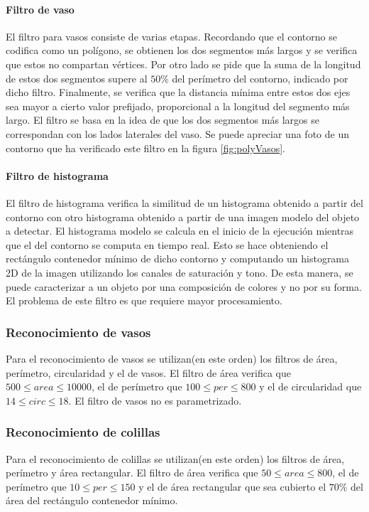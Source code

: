 	\paragraph{Filtro de vaso}
	El filtro para vasos consiste de varias etapas. Recordando que el contorno se codifica como un pol\'igono, se obtienen los dos segmentos 
	m\'as largos y se verifica que estos no compartan v\'ertices. Por otro lado se pide que la suma de la longitud de estos dos segmentos supere al $50\%$ del 
	per\'imetro del contorno, indicado por dicho filtro. Finalmente, se verifica que la distancia m\'inima entre estos dos ejes sea mayor a cierto valor prefijado, proporcional a la
	longitud del segmento m\'as largo. El filtro se basa en la idea de que 
	los dos segmentos m\'as largos se correspondan con los lados laterales 
	del vaso.  Se puede apreciar una foto  de un contorno que ha 
	verificado este filtro en la figura \ref{fig:polyVasos}. 
	\paragraph{Filtro de histograma}
	El filtro de histograma verifica la similitud de un histograma obtenido a partir del contorno con otro histograma obtenido a partir de 
	una imagen modelo del objeto a detectar. El histograma modelo se calcula en el inicio de la ejecuci\'on mientras que el del contorno se
	computa en tiempo real. Esto se hace obteniendo el rect\'angulo 
	contenedor m\'inimo de dicho contorno y computando un histograma 2D de la imagen
	utilizando los canales de saturaci\'on y tono. De esta manera, se 
	puede caracterizar a un objeto por una composici\'on de colores y no por su forma. El 
	problema de este filtro es que requiere mayor procesamiento.
	
	\subsubsection{Reconocimiento de vasos}
	Para el reconocimiento de vasos se utilizan(en este orden) los filtros de \'area, per\'imetro, circularidad y el de vasos.
	El filtro de \'area verifica que $500 \leq area \leq 10000 $, el de 
	per\'imetro que $100 \leq per \leq 800 $ y el de circularidad
	que $14 \leq circ \leq 18$. El filtro de vasos no es parametrizado. 
	
	\subsubsection{Reconocimiento de colillas}
	Para el reconocimiento de colillas se utilizan(en este orden) los filtros de \'area, per\'imetro y \'area rectangular.
	El filtro de \'area verifica que $50 \leq area \leq 800 $, el de per\'imetro que $10 \leq per \leq 150 $ y el de \'area rectangular
	que sea cubierto el $70\%$ del \'area del rect\'angulo contenedor m\'inimo.
	
